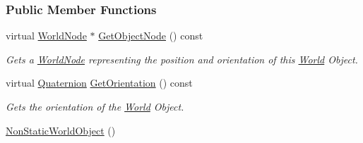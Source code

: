 \subsubsection*{Public Member Functions}
\begin{DoxyCompactItemize}
\item 
virtual \hyperlink{classMezzanine_1_1WorldNode}{WorldNode} $\ast$ \hyperlink{classMezzanine_1_1NonStaticWorldObject_ab83cb88d5bec01ce687ce07180d0acee}{GetObjectNode} () const 
\begin{DoxyCompactList}\small\item\em Gets a \hyperlink{classMezzanine_1_1WorldNode}{WorldNode} representing the position and orientation of this \hyperlink{classMezzanine_1_1World}{World} Object. \item\end{DoxyCompactList}\item 
virtual \hyperlink{classMezzanine_1_1Quaternion}{Quaternion} \hyperlink{classMezzanine_1_1NonStaticWorldObject_adaa959e0758ca685b8009f17d671469f}{GetOrientation} () const 
\begin{DoxyCompactList}\small\item\em Gets the orientation of the \hyperlink{classMezzanine_1_1World}{World} Object. \item\end{DoxyCompactList}\item 
\hypertarget{classMezzanine_1_1NonStaticWorldObject_ae68784bd2201013e99c6a957201c5264}{
\hyperlink{classMezzanine_1_1NonStaticWorldObject_ae68784bd2201013e99c6a957201c5264}{NonStaticWorldObject} ()}
\label{classMezzanine_1_1NonStaticWorldObject_ae68784bd2201013e99c6a957201c5264}


\end{DoxyCompactItemize}
